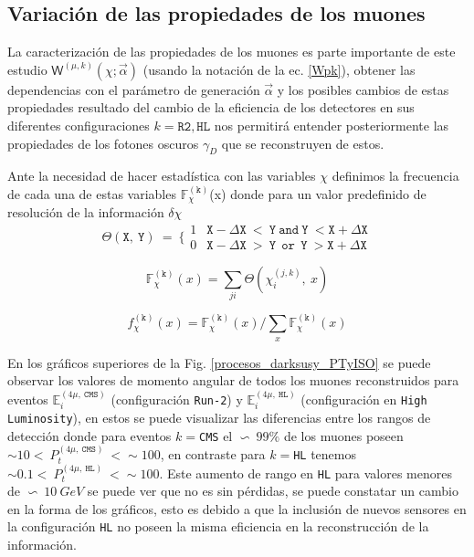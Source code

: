 \subsection{Variación de las propiedades de los muones}
La caracterización de las propiedades de los muones es parte importante de este estudio $ \textsf{W}^{(\mu,k)} (\chi; \vec{\alpha})$ (usando la notación de la ec. \ref{Wpk}), obtener las dependencias con el parámetro de generación $\vec{\alpha}$ y los posibles cambios de estas propiedades resultado del cambio de la eficiencia de los detectores en sus diferentes configuraciones $k=\texttt{R2}, \texttt{HL}$ nos permitirá entender posteriormente las propiedades de los fotones oscuros $\gamma_D$ que se reconstruyen de estos. 





Ante la necesidad de hacer estadística con las variables $\chi$ definimos la frecuencia de cada una de estas variables $\mathbb{F}_\chi^{(\mathtt{k})}$(x) donde para un valor predefinido de resolución de la información $\delta \chi$
\begin{equation}
\mathtt{\Theta(X,~Y)} ~ = ~ \Bigg\{\begin{matrix}
1 & \mathtt{X-\Delta X ~<~Y ~and~Y~ < X+\Delta X}\\
0 & \mathtt{X-\Delta X ~>~Y ~~or~~Y~ > X+\Delta X}
\end{matrix} 
\end{equation}

\begin{equation}
\mathbb{F}_\chi^{(\mathtt{k})} (x)= \sum_{ji} \mathtt{\Theta}(\chi_i^{(j,k)},~x)
\end{equation}

\begin{equation}
f_\chi^{(\mathtt{k})} (x)= \mathbb{F}_\chi^{(\mathtt{k})} (x)/ \sum_x \mathbb{F}_\chi^{(\mathtt{k})} (x)
\end{equation}






En los gráficos superiores de la Fig. \ref{procesos_darksusy_PTyISO} se puede observar los valores de momento angular de todos los muones reconstruidos para eventos $\mathbb{E}_i^{(4\mu,~\mathtt{CMS})}$ (configuración \texttt{Run-2}) y $\mathbb{E}_i^{(4\mu,~\mathtt{HL})}$ (configuración en \texttt{High Luminosity}), en estos se puede visualizar las diferencias entre los rangos de detección donde para eventos $k=$\texttt{CMS} el $\backsim ~ 99\%$ de los muones poseen $\sim 10  < ~ P_t^{(4\mu,~\mathtt{CMS})} ~ <\sim 100$, en contraste para $k=$\texttt{HL} tenemos $\sim 0.1 < ~ P_t^{(4\mu,~\mathtt{HL})} ~ < \sim 100$. Este aumento de rango en \texttt{HL} para valores menores de $\backsim ~ 10~GeV$ se puede ver que no es sin pérdidas, se puede constatar un cambio en la forma de los gráficos, esto es debido a que la inclusión de nuevos sensores en la configuración \texttt{HL} no poseen la misma eficiencia en la reconstrucción de la información.

